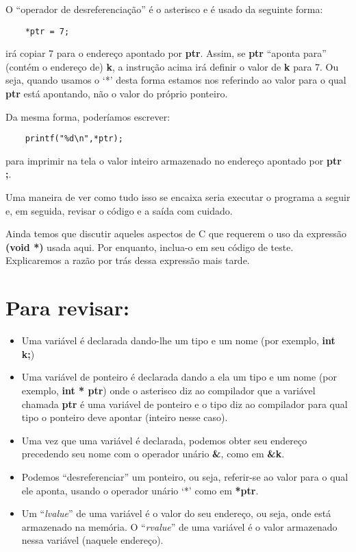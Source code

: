 O ``operador de desreferenciação'' é o asterisco e é usado da seguinte forma:

\begin{lstlisting}
	*ptr = 7;
\end{lstlisting}
irá copiar 7 para o endereço apontado por \textbf{ptr}. Assim, se \textbf{ptr} ``aponta para'' (contém o endereço de) \textbf{k}, a instrução acima irá definir o valor de \textbf{k} para 7. Ou seja, quando usamos o `*' desta forma estamos nos referindo ao valor para o qual \textbf{ptr} está apontando, não o valor do próprio ponteiro.

Da mesma forma, poderíamos escrever:
\begin{lstlisting}
	printf("%d\n",*ptr);
\end{lstlisting}
para imprimir na tela o valor inteiro armazenado no endereço apontado por \textbf{ptr ;}.

Uma maneira de ver como tudo isso se encaixa seria executar o programa a seguir e, em seguida, revisar o código e a saída com cuidado.



\begin{remark}
	Ainda temos que discutir aqueles aspectos de C que requerem o uso da expressão \textbf{(void *)} usada aqui. Por enquanto, inclua-o em seu código de teste. Explicaremos a razão por trás dessa expressão mais tarde.

\end{remark}


\section*{Para revisar:}
\begin{itemize}
	\item Uma variável é declarada dando-lhe um tipo e um nome (por exemplo, \textbf{int k;})
	\item Uma variável de ponteiro é declarada dando a ela um tipo e um nome (por exemplo, \textbf{int * ptr}) onde o asterisco diz ao compilador que a variável chamada \textbf{ptr} é uma variável de ponteiro e o tipo diz ao compilador para qual tipo o ponteiro deve apontar (inteiro nesse caso).
	\item Uma vez que uma variável é declarada, podemos obter seu endereço precedendo seu nome com o operador unário \textbf{\&}, como em \textbf{\&k}.
	\item Podemos ``desreferenciar'' um ponteiro, ou seja, referir-se ao valor para o qual ele aponta, usando o operador unário `*' como em \textbf{*ptr}.
	\item Um ``\textit{lvalue}'' de uma variável é o valor do seu endereço, ou seja, onde está armazenado na memória. O ``\textit{rvalue}'' de uma variável é o valor armazenado nessa variável (naquele endereço).
\end{itemize}

